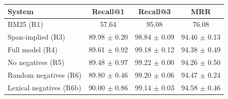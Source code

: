 \begin{tabular}{lccc}
\hline
System & Recall@1 & Recall@3 & MRR \\
\hline
BM25 (R1) & 57.64 & 95.08 & 76.08 \\
Span-implied (R3) & 89.98 $\pm$ 0.20 & 98.84 $\pm$ 0.09 & 94.46 $\pm$ 0.13 \\
Full model (R4) & 89.61 $\pm$ 0.92 & 99.18 $\pm$ 0.12 & 94.38 $\pm$ 0.49 \\
No negatives (R5) & 89.48 $\pm$ 0.97 & 99.22 $\pm$ 0.00 & 94.26 $\pm$ 0.50 \\
Random negatives (R6) & 89.80 $\pm$ 0.46 & 99.20 $\pm$ 0.06 & 94.47 $\pm$ 0.24 \\
Lexical negatives (R6b) & 90.00 $\pm$ 0.86 & 99.14 $\pm$ 0.03 & 94.58 $\pm$ 0.46 \\
\hline
\end{tabular}
